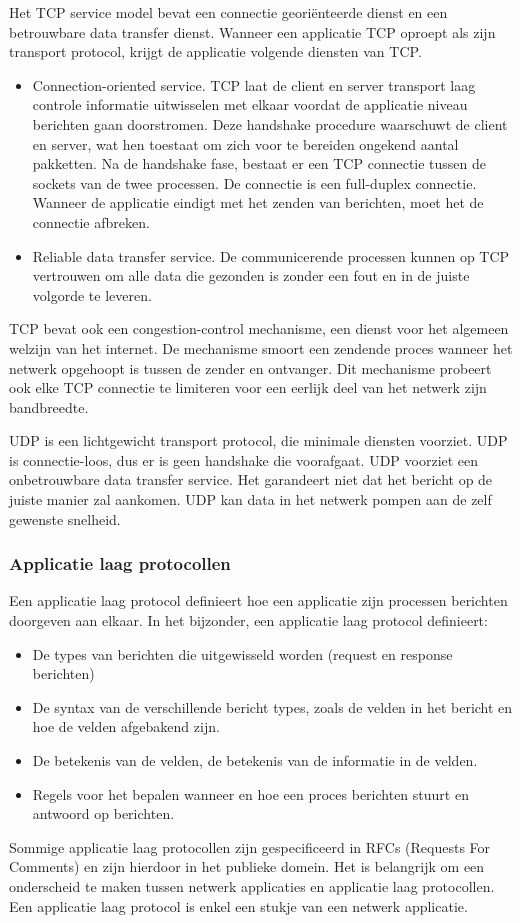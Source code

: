 Het TCP service model bevat een connectie georiënteerde dienst en een betrouwbare data transfer dienst. Wanneer een applicatie TCP oproept als zijn transport protocol, krijgt de applicatie volgende diensten van TCP.
\begin{itemize}
    \item Connection-oriented service. TCP laat de client en server transport laag controle informatie uitwisselen met elkaar voordat de applicatie niveau berichten gaan doorstromen. Deze handshake procedure waarschuwt de client en server, wat hen toestaat om zich voor te bereiden ongekend aantal pakketten. Na de handshake fase, bestaat er een TCP connectie tussen de sockets van de twee processen. De connectie is een full-duplex connectie. Wanneer de applicatie eindigt met het zenden van berichten, moet het de connectie afbreken.
    \item Reliable data transfer service. De communicerende processen kunnen op TCP vertrouwen om alle data die gezonden is zonder een fout en in de juiste volgorde te leveren.
\end{itemize}
TCP bevat ook een congestion-control mechanisme, een dienst voor het algemeen welzijn van het internet. De mechanisme smoort een zendende proces wanneer het netwerk opgehoopt is tussen de zender en ontvanger. Dit mechanisme probeert ook elke TCP connectie te limiteren voor een eerlijk deel van het netwerk zijn bandbreedte.


UDP is een lichtgewicht transport protocol, die minimale diensten voorziet. UDP is connectie-loos, dus er is geen handshake die voorafgaat. UDP voorziet een onbetrouwbare data transfer service. Het garandeert niet dat het bericht op de juiste manier zal aankomen. UDP kan data in het netwerk pompen aan de zelf gewenste snelheid.

\subsubsection{Applicatie laag protocollen}

Een applicatie laag protocol definieert hoe een applicatie zijn processen berichten doorgeven aan elkaar. In het bijzonder, een applicatie laag protocol definieert:
\begin{itemize}
    \item De types van berichten die uitgewisseld worden (request en response berichten)
    \item De syntax van de verschillende bericht types, zoals de velden in het bericht en hoe de velden afgebakend zijn.
    \item De betekenis van de velden, de betekenis van de informatie in de velden.
    \item Regels voor het bepalen wanneer en hoe een proces berichten stuurt en antwoord op berichten.
\end{itemize}
Sommige applicatie laag protocollen zijn gespecificeerd in RFCs (Requests For Comments) en zijn hierdoor in het publieke domein. Het is belangrijk om een onderscheid te maken tussen netwerk applicaties en applicatie laag protocollen. Een applicatie laag protocol is enkel een stukje van een netwerk applicatie.

